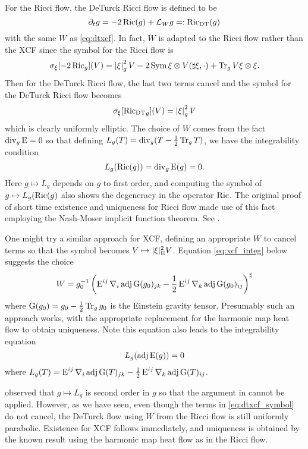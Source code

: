 \documentclass[a4paper,12pt]{amsart}
\begin{document}
\begin{rem}
\label{rem:xcf_rf}

For the Ricci flow, the DeTurck Ricci flow is defined to be
\[
\partial_t g = -2\operatorname{Ric} (g) + \mathcal{L}_{W} g =: \operatorname{\operatorname{Ric}_{\operatorname{DT}}} (g)
\]
with the same \(W\) as \eqref{eq:dtxcf}. In fact, \(W\) is adapted to the Ricci flow rather than the XCF since the symbol for the Ricci flow is
\[
\sigma_{\xi} [-2\operatorname{Ric}_g] (V) = \left\lvert{\xi}\right\rvert^2_{g}V - 2 \operatorname{Sym} \xi \otimes V(\sharp \xi, \cdot) + \operatorname{Tr}_g V \xi \otimes \xi.
\]
Then for the DeTurck Ricci flow, the last two terms cancel and the symbol for the DeTurck Ricci flow becomes
\[
\sigma_{\xi} [\operatorname{\operatorname{Ric}_{\operatorname{DT}}}_g] (V) = \left\lvert{\xi}\right\rvert_g^2 V
\]
which is clearly uniformly elliptic. The choice of \(W\) comes from the fact \(\operatorname{div}_g \operatorname{E} = 0\) so that defining \(L_g(T) = \operatorname{div}_g(T - \tfrac{1}{2} \operatorname{Tr}_g T)\), we have the integrability condition
\[
L_g(\operatorname{Ric}(g)) = \operatorname{div}_g \operatorname{E}(g) = 0.
\]
Here \(g \mapsto L_g\) depends on \(g\) to first order, and computing the symbol of \(g \mapsto L_g(\operatorname{Ric}(g)\) also shows the degeneracy in the operator \(\operatorname{Ric}\). The original proof of short time existence and uniqueness for Ricci flow made use of this fact employing the Nash-Moser implicit function theorem. See \cite[Sections 4-6]{Hamilton:/1982}.

One might try a similar approach for XCF, defining an appropriate \(W\) to cancel terms so that the symbol becomes \(V \mapsto |\xi|_{\operatorname{E}}^2 V\). Equation \eqref{eq:xcf_integ} below suggests the choice
\[
W = g_0^{-1}\left(\operatorname{E}^{ij} \nabla_i \operatorname{adj} \operatorname{G}(g_0)_{jk} - \frac{1}{2} \operatorname{E}^{ij} \nabla_k \operatorname{adj}\operatorname{G}(g_0)_{ij}\right)^{\sharp}
\]
where \(\operatorname{G}(g_0) = g_0 - \tfrac{1}{2} \operatorname{Tr}_g g_0\) is the Einstein gravity tensor. Presumably such an approach works, with the appropriate replacement for the harmonic map heat flow to obtain uniqueness. Note this equation also leads to the integrability equation
\[
L_g(\operatorname{adj}\operatorname{E}(g)) = 0
\]
where \(L_g(T) = \operatorname{E}^{ij} \nabla_i \operatorname{adj} \operatorname{G}(T)_{jk} - \frac{1}{2} \operatorname{E}^{ij} \nabla_k \operatorname{adj}\operatorname{G}(T)_{ij}\).

\cite{MR2207496} observed that \(g \mapsto L_g\) is second order in \(g\) so that the argument in \cite[Sections 4-6]{Hamilton:/1982} cannot be applied. However, as we have seen, even though the terms in \eqref{eq:dtxcf_symbol} do not cancel, the DeTurck flow using \(W\) from the Ricci flow is still uniformly parabolic. Existence for XCF follows immediately, and uniqueness is obtained by the known result using the harmonic map heat flow as in the Ricci flow.
\end{rem}
\end{document}
